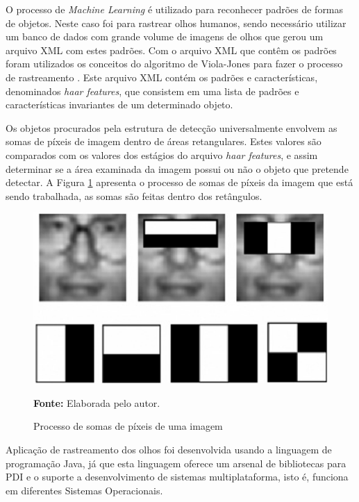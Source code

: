 O processo de \textit{Machine Learning} é utilizado para reconhecer padrões de formas de objetos. Neste caso foi para rastrear olhos humanos, sendo  necessário utilizar um banco de dados com grande volume de imagens de olhos que gerou um arquivo XML com estes padrões. Com o arquivo XML que contêm os padrões foram utilizados os conceitos do algoritmo de Viola-Jones para fazer o processo de rastreamento \cite{viola2001rapid}. Este arquivo XML contém os padrões e características, denominados \textit{haar features}, que consistem em uma lista de padrões e características invariantes de um determinado objeto.

Os objetos procurados pela estrutura de detecção universalmente envolvem as somas de píxeis de imagem dentro de áreas retangulares. Estes valores são comparados com os valores dos estágios do arquivo \textit{haar features}, e assim determinar se a área examinada da imagem possui ou não o objeto que pretende detectar. A Figura \ref{fig:viola-jones-ret} apresenta o processo de somas de píxeis da imagem que está sendo trabalhada, as somas são feitas dentro dos retângulos. 

\begin{figure}[H]
\caption{Processo de somas de píxeis de uma imagem} 
\centering \includegraphics[scale=0.6]{img/viola-jones-ret.png}

{\fontsize{11}{11}\selectfont \textbf{Fonte:} Elaborada pelo autor.}
\label{fig:viola-jones-ret}
\end{figure}

Aplicação de rastreamento dos olhos foi desenvolvida usando a linguagem de programação Java, já que esta linguagem oferece um arsenal de bibliotecas para PDI e o suporte a desenvolvimento de sistemas multiplataforma, isto é, funciona em diferentes Sistemas Operacionais. 

